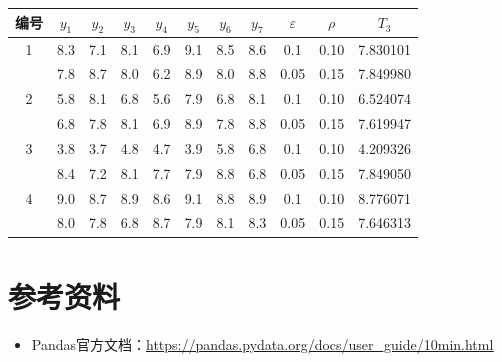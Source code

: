 \begin{table}[H]
    \centering
    \begin{tabular}{ccccccccccc}
    \toprule
    编号 & $y_1$ & $y_2$ & $y_3$ & $y_4$ & $y_5$ & $y_6$ & $y_7$ & $\varepsilon$ & $\rho$ & $T_3$ \\
    \midrule
    1 & 8.3 & 7.1 & 8.1 & 6.9 & 9.1 & 8.5 & 8.6 & 0.1 & 0.10 & 7.830101 \\
      & 7.8 & 8.7 & 8.0 & 6.2 & 8.9 & 8.0 & 8.8 & 0.05 & 0.15 & 7.849980 \\
    \midrule
    2 & 5.8 & 8.1 & 6.8 & 5.6 & 7.9 & 6.8 & 8.1 & 0.1 & 0.10 & 6.524074 \\
      & 6.8 & 7.8 & 8.1 & 6.9 & 8.9 & 7.8 & 8.8 & 0.05 & 0.15 & 7.619947 \\
    \midrule
    3 & 3.8 & 3.7 & 4.8 & 4.7 & 3.9 & 5.8 & 6.8 & 0.1 & 0.10 & 4.209326 \\
      & 8.4 & 7.2 & 8.1 & 7.7 & 7.9 & 8.8 & 6.8 & 0.05 & 0.15 & 7.849050 \\
    \midrule
    4 & 9.0 & 8.7 & 8.9 & 8.6 & 9.1 & 8.8 & 8.9 & 0.1 & 0.10 & 8.776071 \\
      & 8.0 & 7.8 & 6.8 & 8.7 & 7.9 & 8.1 & 8.3 & 0.05 & 0.15 & 7.646313 \\
    \bottomrule
    \end{tabular}
\end{table}

\section{参考资料}

\begin{itemize}
    \item Pandas官方文档：\href{https://pandas.pydata.org/docs/user_guide/10min.html}{\underline{https://pandas.pydata.org/docs/user\_guide/10min.html}}
\end{itemize}

